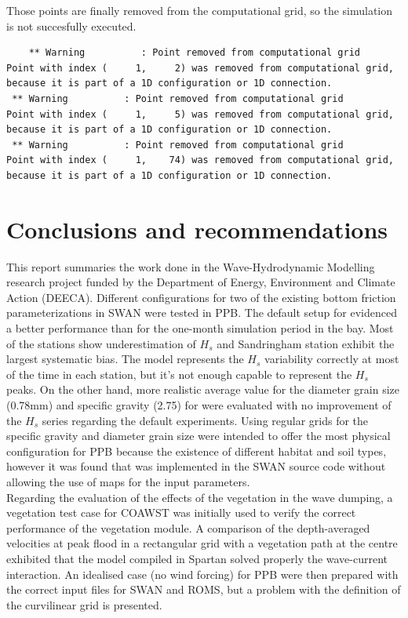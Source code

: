 \documentclass[12pt]{article}
\begin{document}
Those points are finally removed from the computational grid, so the simulation is not succesfully executed.

\begin{lstlisting}
    ** Warning          : Point removed from computational grid
Point with index (     1,     2) was removed from computational grid, because it is part of a 1D configuration or 1D connection.
 ** Warning          : Point removed from computational grid
Point with index (     1,     5) was removed from computational grid, because it is part of a 1D configuration or 1D connection.
 ** Warning          : Point removed from computational grid
Point with index (     1,    74) was removed from computational grid, because it is part of a 1D configuration or 1D connection.
\end{lstlisting}

\section{Conclusions and recommendations}

This report summaries the work done in the Wave-Hydrodynamic Modelling research project funded by the Department of Energy, Environment and Climate Action (DEECA). Different configurations for two of the existing bottom friction parameterizations in SWAN were tested in PPB. The default setup for \textcite{Smith2011} evidenced a better performance than \textcite{Madsen_Poon_Graber_1988} for the one-month simulation period in the bay. Most of the stations show underestimation of $H_s$ and Sandringham station exhibit the largest systematic bias. The model represents the $H_s$ variability correctly at most of the time in each station, but it's not enough capable to represent the $H_s$ peaks. On the other hand, more realistic average value for the diameter grain size (0.78mm) and specific gravity (2.75) for \textcite{Smith2011} were evaluated with no improvement of the $H_s$ series regarding the default experiments.  Using regular grids for the specific gravity and diameter grain size were intended to offer the most physical configuration for PPB because the existence of different habitat and soil types, however it was found that \textcite{Smith2011} was implemented in the SWAN source code without allowing the use of maps for the input parameters.\\  

Regarding the evaluation of the effects of the vegetation in the wave dumping, a vegetation test case for COAWST was initially used to verify the correct performance of the vegetation module. A comparison of the depth-averaged velocities at peak flood in a rectangular grid with a vegetation path at the centre exhibited that the model compiled in Spartan solved properly the wave-current interaction. An idealised case (no wind forcing) for PPB were then prepared with the correct input files for SWAN and ROMS, but a problem with the definition of the curvilinear grid is presented.\\
\end{document}
